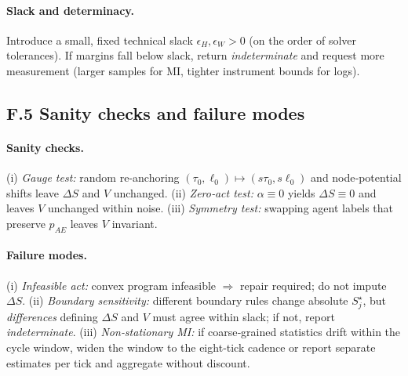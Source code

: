 \documentclass[11pt]{article}
\begin{document}
\paragraph{Slack and determinacy.}
Introduce a small, fixed technical slack $\epsilon_H,\epsilon_W>0$ (on the order of solver tolerances). If margins fall below slack, return \emph{indeterminate} and request more measurement (larger samples for MI, tighter instrument bounds for logs).

\subsection*{F.5 Sanity checks and failure modes}

\paragraph{Sanity checks.}
(i) \emph{Gauge test:} random re‑anchoring $(\tau_0,\ell_0)\mapsto (s\tau_0,s\ell_0)$ and node‑potential shifts leave $\Delta S$ and $V$ unchanged. (ii) \emph{Zero‑act test:} $\alpha\equiv 0$ yields $\Delta S\equiv 0$ and leaves $V$ unchanged within noise. (iii) \emph{Symmetry test:} swapping agent labels that preserve $p_{AE}$ leaves $V$ invariant.

\paragraph{Failure modes.}
(i) \emph{Infeasible act:} convex program infeasible $\Rightarrow$ repair required; do not impute $\Delta S$. (ii) \emph{Boundary sensitivity:} different boundary rules change absolute $S_j^\star$, but \emph{differences} defining $\Delta S$ and $V$ must agree within slack; if not, report \emph{indeterminate}. (iii) \emph{Non‑stationary MI:} if coarse‑grained statistics drift within the cycle window, widen the window to the eight‑tick cadence or report separate estimates per tick and aggregate without discount.
\end{document}
